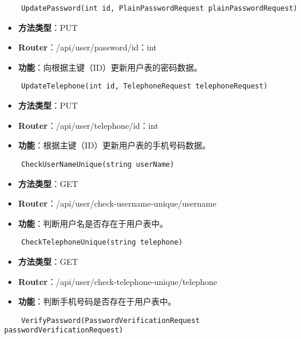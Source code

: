 \begin{verbatim}
	UpdatePassword(int id, PlainPasswordRequest plainPasswordRequest)
\end{verbatim}

\begin{itemize}
	\item \textbf{方法类型}：PUT
	\item \textbf{Router}：/api/user/password/{id：int}
	\item \textbf{功能}：向根据主键（ID）更新用户表的密码数据。
\end{itemize}

\begin{verbatim}
	UpdateTelephone(int id, TelephoneRequest telephoneRequest)
\end{verbatim}

\begin{itemize}
	\item \textbf{方法类型}：PUT
	\item \textbf{Router}：/api/user/telephone/{id：int}
	\item \textbf{功能}：根据主键（ID）更新用户表的手机号码数据。
\end{itemize}

\begin{verbatim}
	CheckUserNameUnique(string userName)
\end{verbatim}

\begin{itemize}
	\item \textbf{方法类型}：GET
	\item \textbf{Router}：/api/user/check-username-unique/{username}
	\item \textbf{功能}：判断用户名是否存在于用户表中。
\end{itemize}

\begin{verbatim}
	CheckTelephoneUnique(string telephone)
\end{verbatim}

\begin{itemize}
	\item \textbf{方法类型}：GET
	\item \textbf{Router}：/api/user/check-telephone-unique/{telephone}
	\item \textbf{功能}：判断手机号码是否存在于用户表中。
\end{itemize}

\begin{verbatim}
	VerifyPassword(PasswordVerificationRequest passwordVerificationRequest)
\end{verbatim}

